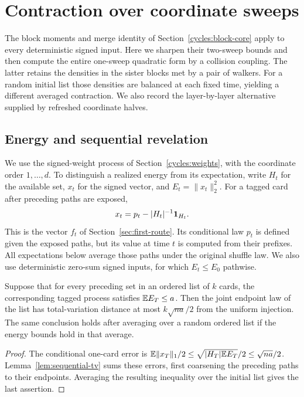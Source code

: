 \section{Contraction over coordinate sweeps}\label{sweeps:section}
The block moments and merge identity of
Section~\ref{cycles:block-core} apply to every deterministic signed
input. Here we sharpen their two-sweep bounds and then compute the
entire one-sweep quadratic form by a collision coupling. The latter
retains the densities in the sister blocks met by a pair of walkers.
For a random initial list those densities are balanced at each fixed
time, yielding a different averaged contraction. We also record the
layer-by-layer alternative supplied by refreshed coordinate halves.

\subsection{Energy and sequential revelation}\label{sweeps:mass-section}
We use the signed-weight process of Section~\ref{cycles:weights}, with
the coordinate order $1,\ldots,d$. To distinguish a realized energy
from its expectation, write $H_t$ for the available set, $x_t$ for the
signed vector, and $E_t=\|x_t\|_2^2$. For a tagged card after preceding
paths are exposed,
\[
 x_t=p_t-|H_t|^{-1}\mathbf 1_{H_t}.
\]
This is the vector $f_t$ of Section~\ref{sec:first-route}. Its conditional
law $p_t$ is defined given the exposed paths, but its value at time $t$
is computed from their prefixes. All expectations below average those
paths under the original shuffle law. We also use deterministic
zero-sum signed inputs, for which $E_t\le E_0$ pathwise.

\begin{lemma}\label{sweeps:sequential}
Suppose that for every preceding set in an ordered list of $k$ cards, the
corresponding tagged process satisfies $\mathbb E E_T\le a$. Then the joint
endpoint law of the list has total-variation distance at most
$k\sqrt{na}/2$ from the uniform injection. The same conclusion holds after
averaging over a random ordered list if the energy bounds hold in that average.
\end{lemma}
\begin{proof}
The conditional one-card error is
$\mathbb E\|x_T\|_1/2\le\sqrt{|H_T|\mathbb E E_T}/2\le\sqrt{na}/2$.
Lemma~\ref{lem:sequential-tv} sums these errors, first coarsening the
preceding paths to their endpoints. Averaging the resulting inequality
over the initial list gives the last assertion.
\end{proof}

